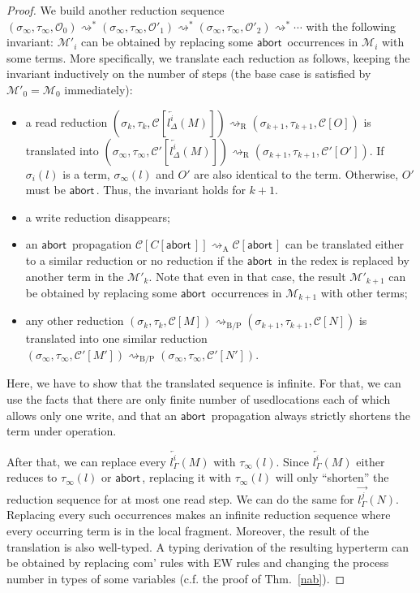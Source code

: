 \documentclass[doctor]{iscs-thesis}
\newcommand{\hypc}[2]{{\mathcal{C}#1}\left[{#2}\right]}
\newcommand{\hypert}{\mathcal{O}}
\newcommand{\reduce}{\rightsquigarrow}
\newcommand{\ltor}[4]{\overrightarrow{{#2}^{#1}_{#3}} \left({#4}\right)}
\newcommand{\rtol}[4]{\overleftarrow{{#2}^{#1}_{#3}} \left({#4}\right)}
\newcommand{\abort}{\mathsf{abort\,}}
\newcommand{\lstore}{{\sigma}}
\newcommand{\rstore}{{\tau}}
\newcommand{\conf}[3]{(\lstore{#1},\rstore{#2},{#3})}
\newcommand{\areduce}{\reduce_{\mathrm A}}
\newcommand{\rreduce}{\reduce_{\mathrm R}}
\newcommand{\bpreduce}{\reduce_{\mathrm{B/P}}}
\begin{document}
\begin{proof}
We build another reduction sequence
$
\conf{_\infty}{_\infty}{\hypert_0}
\reduce^\ast
\conf{_\infty}{_\infty}{\hypert'_1}
\reduce^\ast
\conf{_\infty}{_\infty}{\hypert'_2}
\reduce^\ast\cdots
$
with the following invariant:
$\mathcal M'_i$ can be obtained by replacing some $\abort$ occurrences
in $\mathcal M_i$ with some terms.
More specifically, we translate each reduction as follows, keeping the
invariant inductively on the number of steps
(the base case is satisfied by $\mathcal M'_0 = \mathcal M_0$ immediately):
\begin{itemize}
 \item a read reduction $\conf{_k}{_k}{\hypc{}{\rtol i l\Delta M}}
       \rreduce
       \conf{_{k+1}}{_{k+1}}{\hypc{}{O}}$ is translated into
       $\conf{_\infty}{_\infty}{\hypc'{\rtol i l\Delta M}} \rreduce
       \conf{_{k+1}}{_{k+1}}{\hypc'{O'}}$.
       If $\lstore_i(l)$ is a term,
       $\lstore_\infty(l)$ and $O'$ are also identical to the term.
       Otherwise, $O'$ must be $\abort$.
       Thus, the invariant
       holds for $k+1$.
 \item a write reduction disappears;
 \item an $\abort$ propagation
       $\hypc{}{C[\abort]} \areduce \hypc{}{\abort}$ can be translated
       either to a similar reduction or no reduction if the $\abort$ in
       the redex is replaced by another term in the $\mathcal{M'}_k$.
       Note that even in that case, the result $\mathcal{M'}_{k+1}$ can
       be obtained by replacing some $\abort$ occurrences in
       $\mathcal{M}_{k+1}$ with other terms;
 \item any other reduction $\conf{_k}{_k}{\hypc{}{M}} \bpreduce
       \conf{_{k+1}}{_{k+1}}{\hypc{}{N}}$
       is translated into one similar reduction
       $\conf{_\infty}{_\infty}{\hypc{'}{M'}}\bpreduce
        \conf{_\infty}{_\infty}{\hypc{'}{N'}}$.
\end{itemize}
Here, we have to show that the translated sequence is infinite.
For that, we can use the facts that
 there are only finite
number of usedlocations each of which allows only one write, and that
an $\abort$ propagation always
strictly shortens the term under operation. 
 
 After that, we can replace
 every ${\rtol i l\Gamma M}$ with
 $\rstore_\infty(l)$.
 Since $\rtol i l\Gamma M$ either reduces to $\rstore_\infty(l)$ or $\abort$,
 replacing it with $\rstore_\infty(l)$ will only ``shorten'' the reduction
 sequence for at most one read step.
 We can do the same for $\ltor j l \Gamma N$.
 Replacing every such occurrences
 makes an infinite reduction sequence where every occurring term is
 in the local fragment.
 Moreover, 
 the result of the translation is also well-typed.
 A typing derivation of the resulting hyperterm can be obtained by
 replacing com' rules with EW rules and changing the process number in
 types of some variables (c.f. the proof of Thm.~\ref{nab}).


\end{proof}
\end{document}
